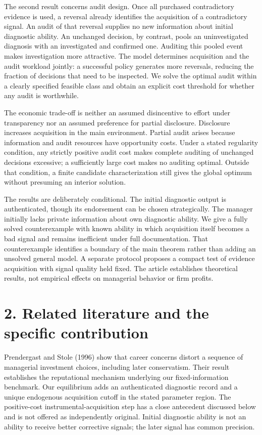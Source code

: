 \documentclass[
  11pt,
]{article}
\begin{document}
The second result concerns audit design. Once all purchased
contradictory evidence is used, a reversal already identifies the
acquisition of a contradictory signal. An audit of that reversal
supplies no new information about initial diagnostic ability. An
unchanged decision, by contrast, pools an uninvestigated diagnosis with
an investigated and confirmed one. Auditing this pooled event makes
investigation more attractive. The model determines acquisition and the
audit workload jointly: a successful policy generates more reversals,
reducing the fraction of decisions that need to be inspected. We solve
the optimal audit within a clearly specified feasible class and obtain
an explicit cost threshold for whether any audit is worthwhile.

The economic trade-off is neither an assumed disincentive to effort
under transparency nor an assumed preference for partial disclosure.
Disclosure increases acquisition in the main environment. Partial audit
arises because information and audit resources have opportunity costs.
Under a stated regularity condition, any strictly positive audit cost
makes complete auditing of unchanged decisions excessive; a sufficiently
large cost makes no auditing optimal. Outside that condition, a finite
candidate characterization still gives the global optimum without
presuming an interior solution.

The results are deliberately conditional. The initial diagnostic output
is authenticated, though its endorsement can be chosen strategically.
The manager initially lacks private information about own diagnostic
ability. We give a fully solved counterexample with known ability in
which acquisition itself becomes a bad signal and remains inefficient
under full documentation. That counterexample identifies a boundary of
the main theorem rather than adding an unsolved general model. A
separate protocol proposes a compact test of evidence acquisition with
signal quality held fixed. The article establishes theoretical results,
not empirical effects on managerial behavior or firm profits.

\section{2. Related literature and the specific
contribution}\label{related-literature-and-the-specific-contribution}

Prendergast and Stole (1996) show that career concerns distort a
sequence of managerial investment choices, including later conservatism.
Their result establishes the reputational mechanism underlying our
fixed-information benchmark. Our equilibrium adds an authenticated
diagnostic record and a unique endogenous acquisition cutoff in the
stated parameter region. The positive-cost instrumental-acquisition step
has a close antecedent discussed below and is not offered as
independently original. Initial diagnostic ability is not an ability to
receive better corrective signals; the later signal has common
precision.
\end{document}
